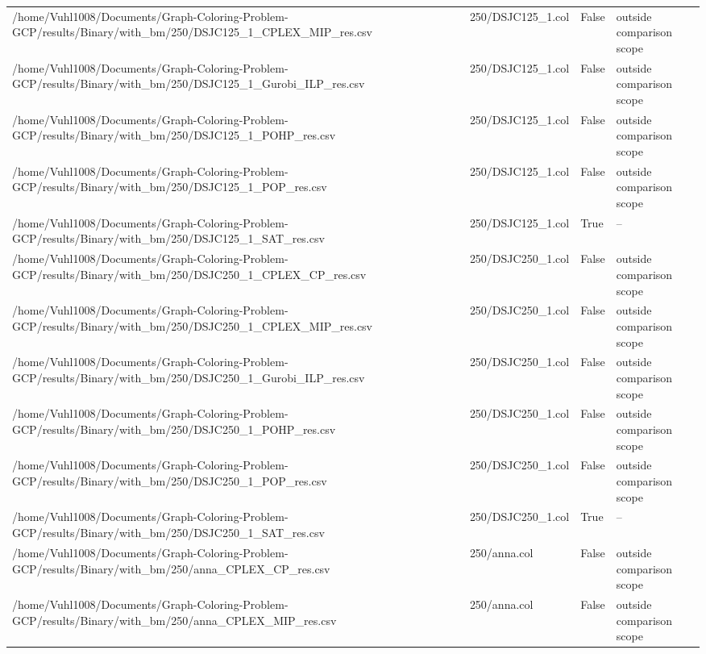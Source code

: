 \begin{table}[htbp]
\begin{tabular}{llll}
/home/Vuhl1008/Documents/Graph-Coloring-Problem-GCP/results/Binary/with\_bm/250/DSJC125\_1\_CPLEX\_MIP\_res.csv & 250/DSJC125\_1.col & False & outside comparison scope \\
/home/Vuhl1008/Documents/Graph-Coloring-Problem-GCP/results/Binary/with\_bm/250/DSJC125\_1\_Gurobi\_ILP\_res.csv & 250/DSJC125\_1.col & False & outside comparison scope \\
/home/Vuhl1008/Documents/Graph-Coloring-Problem-GCP/results/Binary/with\_bm/250/DSJC125\_1\_POHP\_res.csv & 250/DSJC125\_1.col & False & outside comparison scope \\
/home/Vuhl1008/Documents/Graph-Coloring-Problem-GCP/results/Binary/with\_bm/250/DSJC125\_1\_POP\_res.csv & 250/DSJC125\_1.col & False & outside comparison scope \\
/home/Vuhl1008/Documents/Graph-Coloring-Problem-GCP/results/Binary/with\_bm/250/DSJC125\_1\_SAT\_res.csv & 250/DSJC125\_1.col & True & -- \\
/home/Vuhl1008/Documents/Graph-Coloring-Problem-GCP/results/Binary/with\_bm/250/DSJC250\_1\_CPLEX\_CP\_res.csv & 250/DSJC250\_1.col & False & outside comparison scope \\
/home/Vuhl1008/Documents/Graph-Coloring-Problem-GCP/results/Binary/with\_bm/250/DSJC250\_1\_CPLEX\_MIP\_res.csv & 250/DSJC250\_1.col & False & outside comparison scope \\
/home/Vuhl1008/Documents/Graph-Coloring-Problem-GCP/results/Binary/with\_bm/250/DSJC250\_1\_Gurobi\_ILP\_res.csv & 250/DSJC250\_1.col & False & outside comparison scope \\
/home/Vuhl1008/Documents/Graph-Coloring-Problem-GCP/results/Binary/with\_bm/250/DSJC250\_1\_POHP\_res.csv & 250/DSJC250\_1.col & False & outside comparison scope \\
/home/Vuhl1008/Documents/Graph-Coloring-Problem-GCP/results/Binary/with\_bm/250/DSJC250\_1\_POP\_res.csv & 250/DSJC250\_1.col & False & outside comparison scope \\
/home/Vuhl1008/Documents/Graph-Coloring-Problem-GCP/results/Binary/with\_bm/250/DSJC250\_1\_SAT\_res.csv & 250/DSJC250\_1.col & True & -- \\
/home/Vuhl1008/Documents/Graph-Coloring-Problem-GCP/results/Binary/with\_bm/250/anna\_CPLEX\_CP\_res.csv & 250/anna.col & False & outside comparison scope \\
/home/Vuhl1008/Documents/Graph-Coloring-Problem-GCP/results/Binary/with\_bm/250/anna\_CPLEX\_MIP\_res.csv & 250/anna.col & False & outside comparison scope \\

\end{tabular}
\end{table}
